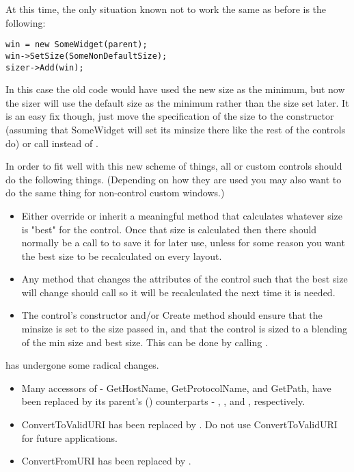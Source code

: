 At this time, the only situation known not to work the same as before is the following:
\begin{verbatim}
win = new SomeWidget(parent);
win->SetSize(SomeNonDefaultSize);
sizer->Add(win);
\end{verbatim}

In this case the old code would have used the new size as the minimum, but now the sizer will use the default size as the minimum rather than the size set later.  It is an easy fix though, just move the specification of the size to the constructor (assuming that SomeWidget will set its minsize there like the rest of the controls do) or call  instead of .

In order to fit well with this new scheme of things, all  or custom controls should do the following things.  (Depending on how they are used you may also want to do the same thing for non-control custom windows.)

\begin{itemize}\itemsep=0pt
\item Either override or inherit a meaningful  method that calculates whatever size is "best" for the control.  Once that size is calculated then there should normally be a call to  to save it for later use, unless for some reason you want the best size to be recalculated on every layout.
\item Any method that changes the attributes of the control such that the best size will change should call  so it will be recalculated the next time it is needed.
\item The control's constructor and/or Create method should ensure that the minsize is set to the size passed in, and that the control is sized to a blending of the min size and best size.  This can be done by calling .
\end{itemize}



 has undergone some radical changes.

\begin{itemize}\itemsep=0pt
\item Many accessors of  - GetHostName, GetProtocolName, and GetPath, have been replaced by its parent's () counterparts - , , and , respectively.
\item ConvertToValidURI has been replaced by .  Do not use ConvertToValidURI for future applications.
\item ConvertFromURI has been replaced by .
\end{itemize}


